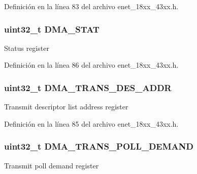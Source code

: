 Definición en la línea 83 del archivo enet\+\_\+18xx\+\_\+43xx.\+h.

\subsubsection[{\texorpdfstring{D\+M\+A\+\_\+\+S\+T\+AT}{DMA_STAT}}]{ uint32\+\_\+t D\+M\+A\+\_\+\+S\+T\+AT}\hypertarget{struct_l_p_c___e_n_e_t___t_a0e8f4d72df361d989a8cc77e6036874a}{}\label{struct_l_p_c___e_n_e_t___t_a0e8f4d72df361d989a8cc77e6036874a}
Status register 

Definición en la línea 86 del archivo enet\+\_\+18xx\+\_\+43xx.\+h.

\subsubsection[{\texorpdfstring{D\+M\+A\+\_\+\+T\+R\+A\+N\+S\+\_\+\+D\+E\+S\+\_\+\+A\+D\+DR}{DMA_TRANS_DES_ADDR}}]{ uint32\+\_\+t D\+M\+A\+\_\+\+T\+R\+A\+N\+S\+\_\+\+D\+E\+S\+\_\+\+A\+D\+DR}\hypertarget{struct_l_p_c___e_n_e_t___t_a2cea74910e5e2f2108ec4af2ae6de069}{}\label{struct_l_p_c___e_n_e_t___t_a2cea74910e5e2f2108ec4af2ae6de069}
Transmit descriptor list address register 

Definición en la línea 85 del archivo enet\+\_\+18xx\+\_\+43xx.\+h.

\subsubsection[{\texorpdfstring{D\+M\+A\+\_\+\+T\+R\+A\+N\+S\+\_\+\+P\+O\+L\+L\+\_\+\+D\+E\+M\+A\+ND}{DMA_TRANS_POLL_DEMAND}}]{ uint32\+\_\+t D\+M\+A\+\_\+\+T\+R\+A\+N\+S\+\_\+\+P\+O\+L\+L\+\_\+\+D\+E\+M\+A\+ND}\hypertarget{struct_l_p_c___e_n_e_t___t_ab1393b581be14a9c107aaac597b2eff3}{}\label{struct_l_p_c___e_n_e_t___t_ab1393b581be14a9c107aaac597b2eff3}
Transmit poll demand register 

